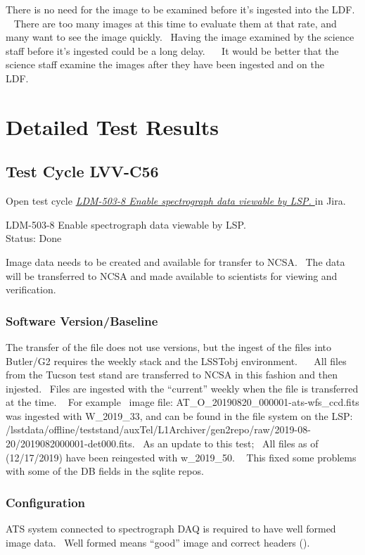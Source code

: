 \documentclass[DM,lsstdraft,STR,toc]{lsstdoc}
\begin{document}
There is no need for the image to be examined before it's ingested into
the LDF. ~ There are too many images at this time to evaluate them at
that rate, and many want to see the image quickly. ~Having the image
examined by the science staff before it's ingested could be a long
delay. ~ ~It would be better that the science staff examine the images
after they have been ingested and on the LDF.~~


\newpage
\section{Detailed Test Results}
\label{sect:detailedtestresults}

\subsection{Test Cycle LVV-C56 }

Open test cycle {\it \href{https://jira.lsstcorp.org/secure/Tests.jspa#/testrun/LVV-C56}{LDM-503-8 Enable spectrograph data viewable by LSP.
}} in Jira.

LDM-503-8 Enable spectrograph data viewable by LSP.
\\
Status: Done

Image data needs to be created and available for transfer to NCSA. ~The
data will be transferred to NCSA and made available to scientists for
viewing and verification.~ ~~


\subsubsection{Software Version/Baseline}
The transfer of the file does not use versions, but the ingest of the
files into Butler/G2 requires the weekly stack and the LSSTobj
environment. ~ ~All files from the Tucson test stand are transferred to
NCSA in this fashion and then injested. ~Files are ingested with the
``current'' weekly when the file is transferred at the time. ~ For
example ~image file: AT\_O\_20190820\_000001-ats-wfs\_ccd.fits was
ingested with W\_2019\_33, and can be found in the file system on the
LSP:
/lsstdata/offline/teststand/auxTel/L1Archiver/gen2repo/raw/2019-08-20/2019082000001-det000.fits.
~As an update to this test; ~All files as of (12/17/2019) have been
reingested with w\_2019\_50. ~ This fixed some problems with some of the
DB fields in the sqlite repos.~ ~


\subsubsection{Configuration}
ATS system connected to spectrograph DAQ is required to have well formed
image data. ~Well formed means ``good'' image and correct headers
(). ~\\[2\baselineskip]
\end{document}
